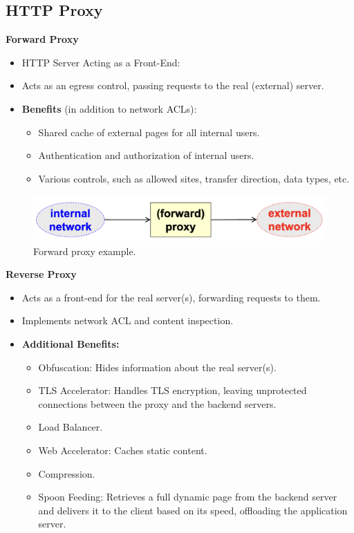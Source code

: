 \subsection*{HTTP Proxy}
\begin{center}
    \textbf{Forward Proxy}
\end{center}

\begin{itemize}
\item {HTTP Server Acting as a Front-End:}
\item Acts as an egress control, passing requests to the real (external) server.
\item \textbf{Benefits} (in addition to network ACLs):
\begin{itemize}
    \item Shared cache of external pages for all internal users.
    \item Authentication and authorization of internal users.
    \item Various controls, such as allowed sites, transfer direction, data types, etc.
\end{itemize}
\end{itemize}

\begin{figure}[H]
    \centering
    \includegraphics[width=0.5\linewidth]{Images/Firewalling/forward_proxy.png}
    \caption{Forward proxy example.}
\end{figure}
    
\begin{center}
    \textbf{Reverse Proxy}
\end{center} 

\begin{itemize}
    \item Acts as a front-end for the real server(s), forwarding requests to them.
    \item Implements network ACL and content inspection.
    \item \textbf{Additional Benefits:}
    \begin{itemize}
        \item Obfuscation: Hides information about the real server(s).
        \item TLS Accelerator: Handles TLS encryption, leaving unprotected connections between the proxy and the backend servers.
        \item Load Balancer.
        \item Web Accelerator: Caches static content.
        \item Compression.
        \item Spoon Feeding: Retrieves a full dynamic page from the backend server and delivers it to the client based on its speed, offloading the application server.
    \end{itemize}
\end{itemize}

